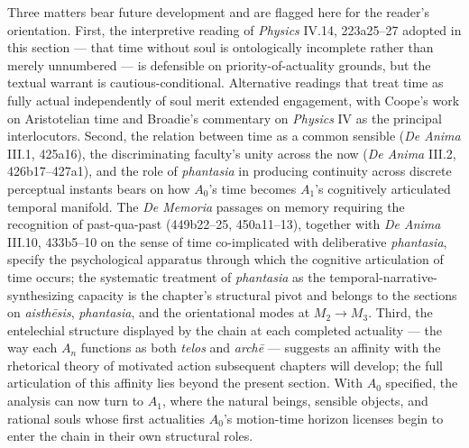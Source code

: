 Three matters bear future development and are flagged here for the reader's orientation. First, the interpretive reading of \textit{Physics} IV.14, 223a25--27 adopted in this section --- that time without soul is ontologically incomplete rather than merely unnumbered --- is defensible on priority-of-actuality grounds, but the textual warrant is cautious-conditional. Alternative readings that treat time as fully actual independently of soul merit extended engagement, with Coope's work on Aristotelian time and Broadie's commentary on \textit{Physics} IV as the principal interlocutors. Second, the relation between time as a common sensible (\textit{De Anima} III.1, 425a16), the discriminating faculty's unity across the now (\textit{De Anima} III.2, 426b17--427a1), and the role of \textit{phantasia} in producing continuity across discrete perceptual instants bears on how $A_0$'s time becomes $A_1$'s cognitively articulated temporal manifold. The \textit{De Memoria} passages on memory requiring the recognition of past-qua-past (449b22--25, 450a11--13), together with \textit{De Anima} III.10, 433b5--10 on the sense of time co-implicated with deliberative \textit{phantasia}, specify the psychological apparatus through which the cognitive articulation of time occurs; the systematic treatment of \textit{phantasia} as the temporal-narrative-synthesizing capacity is the chapter's structural pivot and belongs to the sections on \textit{aisthēsis}, \textit{phantasia}, and the orientational modes at $M_2 \rightarrow M_3$. Third, the entelechial structure displayed by the chain at each completed actuality --- the way each $A_n$ functions as both \textit{telos} and \textit{archē} --- suggests an affinity with the rhetorical theory of motivated action subsequent chapters will develop; the full articulation of this affinity lies beyond the present section. With $A_0$ specified, the analysis can now turn to $A_1$, where the natural beings, sensible objects, and rational souls whose first actualities $A_0$'s motion-time horizon licenses begin to enter the chain in their own structural roles.
